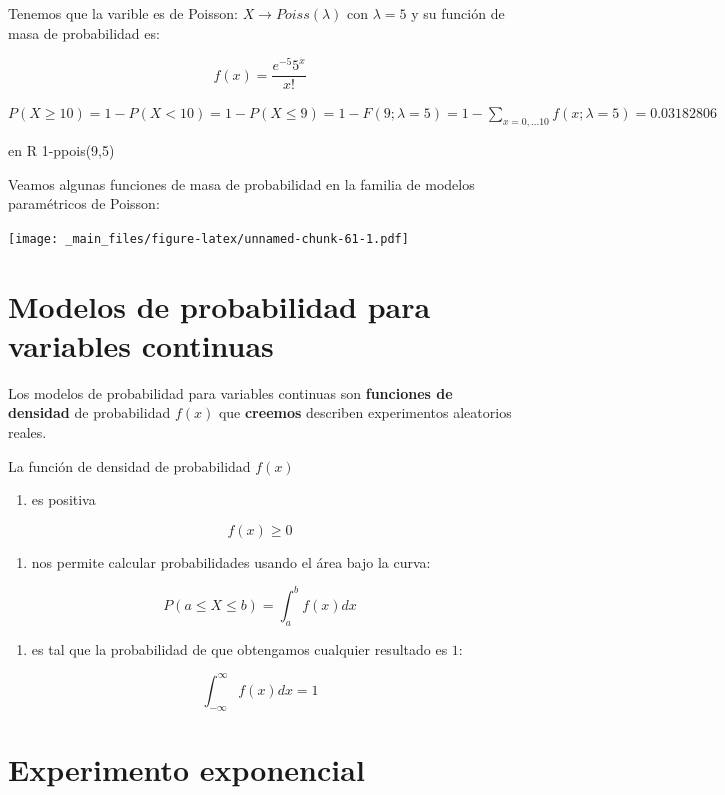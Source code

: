 \documentclass[
]{book}
\providecommand{\tightlist}{%
  \setlength{\itemsep}{0pt}\setlength{\parskip}{0pt}}
\begin{document}
Tenemos que la varible es de Poisson: \(X \rightarrow Poiss(\lambda)\) con \(\lambda=5\) y su función de masa de probabilidad es:

\[f(x)= \frac{e^{-5}5^x}{x!}\]

\(P(X\geq 10)=1-P(X < 10)=1-P(X \leq 9)=1-F(9; \lambda=5)=1-\sum_{x=0, ...10}f(x; \lambda=5)=0.03182806\)

en R 1-ppois(9,5)

Veamos algunas funciones de masa de probabilidad en la familia de modelos paramétricos de Poisson:

\texttt{[image: \_main\_files/figure-latex/unnamed-chunk-61-1.pdf]}

\hypertarget{modelos-de-probabilidad-para-variables-continuas}{%
\section{Modelos de probabilidad para variables continuas}\label{modelos-de-probabilidad-para-variables-continuas}}

Los modelos de probabilidad para variables continuas son \textbf{funciones de densidad} de probabilidad \(f(x)\) que \textbf{creemos} describen experimentos aleatorios reales.

La función de densidad de probabilidad \(f(x)\)

\begin{enumerate}
\def\labelenumi{\arabic{enumi})}
\tightlist
\item
  es positiva
\end{enumerate}

\[f(x) \geq 0\]

\begin{enumerate}
\def\labelenumi{\arabic{enumi})}
\setcounter{enumi}{1}
\tightlist
\item
  nos permite calcular probabilidades usando el área bajo la curva:
\end{enumerate}

\[P(a\leq X \leq b)=\int_{a}^{b} f(x) dx\]

\begin{enumerate}
\def\labelenumi{\arabic{enumi})}
\setcounter{enumi}{2}
\tightlist
\item
  es tal que la probabilidad de que obtengamos cualquier resultado es \(1\):
\end{enumerate}

\[\int_{-\infty}^{\infty} f(x) dx = 1\]

\hypertarget{experimento-exponencial}{%
\section{Experimento exponencial}\label{experimento-exponencial}}
\end{document}

